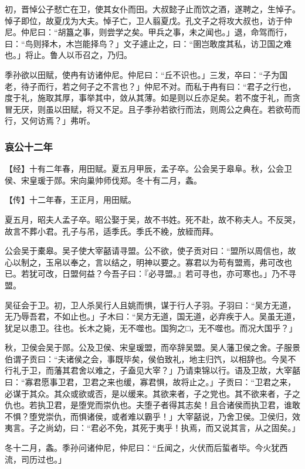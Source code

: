 \documentclass[]{article}
\begin{document}
初，晋悼公子憖亡在卫，使其女仆而田。大叔懿子止而饮之酒，遂聘之，生悼子。悼子即位，故夏戊为大夫。悼子亡，卫人翦夏戊。孔文子之将攻大叔也，访于仲尼。仲尼曰：``胡簋之事，则尝学之矣。甲兵之事，未之闻也。」退，命驾而行，曰：``鸟则择木，木岂能择鸟？」文子遽止之，曰：``圉岂敢度其私，访卫国之难也。」将止。鲁人以币召之，乃归。

季孙欲以田赋，使冉有访诸仲尼。仲尼曰：``丘不识也。」三发，卒曰：``子为国老，待子而行，若之何子之不言也？」仲尼不对。而私于冉有曰：``君子之行也，度于礼，施取其厚，事举其中，敛从其薄。如是则以丘亦足矣。若不度于礼，而贪冒无厌，则虽以田赋，将又不足。且子季孙若欲行而法，则周公之典在。若欲苟而行，又何访焉？」弗听。

\hypertarget{header-n3168}{%
\subsubsection{哀公十二年}\label{header-n3168}}

【经】十有二年春，用田赋。夏五月甲辰，孟子卒。公会吴于皋阜。秋，公会卫侯、宋皇瑗于郧。宋向巢帅师伐郑。冬十有二月，螽。

【传】十二年春，王正月，用田赋。

夏五月，昭夫人孟子卒。昭公娶于吴，故不书姓。死不赴，故不称夫人。不反哭，故言不葬小君。孔子与吊，适季氏。季氏不絻，放絰而拜。

公会吴于橐皋。吴子使大宰嚭请寻盟。公不欲，使子贡对曰：``盟所以周信也，故心以制之，玉帛以奉之，言以结之，明神以要之。寡君以为苟有盟焉，弗可改也已。若犹可改，日盟何益？今吾子曰：『必寻盟。』若可寻也，亦可寒也。」乃不寻盟。

吴征会于卫。初，卫人杀吴行人且姚而惧，谋于行人子羽。子羽曰：``吴方无道，无乃辱吾君，不如止也。」子木曰：``吴方无道，国无道，必弃疾于人。吴虽无道，犹足以患卫。往也。长木之毙，无不噬也。国狗之□，无不噬也。而况大国乎？」

秋，卫侯会吴于郧。公及卫侯、宋皇瑗盟，而卒辞吴盟。吴人藩卫侯之舍。子服景伯谓子贡曰：``夫诸侯之会，事既毕矣，侯伯致礼，地主归饩，以相辞也。今吴不行礼于卫，而藩其君舍以难之，子盍见大宰？」乃请束锦以行。语及卫故，大宰嚭曰：``寡君愿事卫君，卫君之来也缓，寡君惧，故将止之。」子贡曰：``卫君之来，必谋于其众。其众或欲或否，是以缓来。其欲来者，子之党也。其不欲来者，子之仇也。若执卫君，是堕党而崇仇也。夫堕子者得其志矣！且合诸侯而执卫君，谁敢不惧？堕党崇仇，而惧诸侯，或者难以霸乎！」大宰嚭说，乃舍卫侯。卫侯归，效夷言。子之尚幼，曰：``君必不免，其死于夷乎！执焉，而又说其言，从之固矣。」

冬十二月，螽。季孙问诸仲尼，仲尼曰：``丘闻之，火伏而后蜇者毕。今火犹西流，司历过也。」
\end{document}
